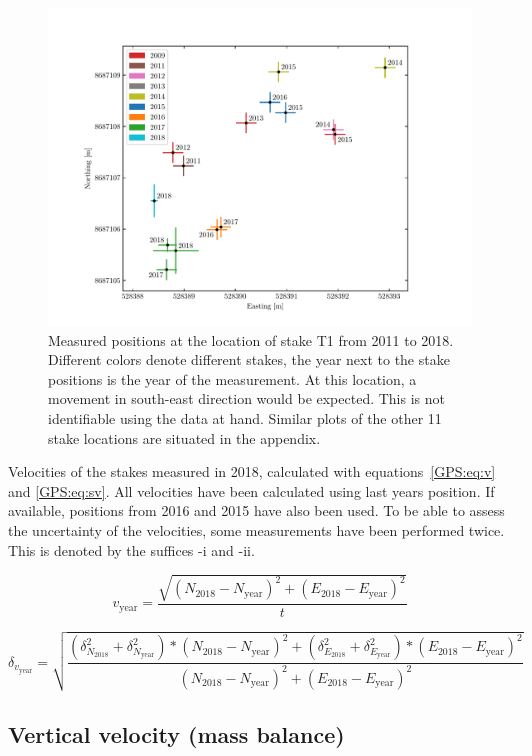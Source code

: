 \begin{figure}[H]
    \centering
    \includegraphics[width=\textwidth]{./figs/T1_2d.pdf}
    \caption{Measured positions at the location of stake T1 from 2011 to 2018.
    Different colors denote different stakes,
  	the year next to the stake positions is the year of the measurement.
    	At this location, a movement in south-east direction would be expected.
    	This is not identifiable using the data at hand.
 	Similar plots of the other 11 stake locations are situated in the appendix.}
    \label{GPS:fig:T1_2d}
\end{figure}


\begin{table}[h]
	\caption{Velocities of the stakes measured in 2018, calculated with equations~\ref{GPS:eq:v} and \ref{GPS:eq:sv}.
	All velocities have been calculated using last years position.
	If available, positions from 2016 and 2015 have also been used.
	To be able to assess the uncertainty of the velocities, some measurements have been performed twice.
	This is denoted by the suffices -i and -ii.}
	\centering
	
	\label{GPS:tab:os_tab}
\end{table}

\begin{equation}
\label{GPS:eq:v}
v_\text{year} = \frac{\sqrt{(N_{2018}-N_{\text{year}})^2+(E_{2018} - E_{\text{year}})^2}}{t}
\end{equation}

\begin{equation}
\label{GPS:eq:sv}
\delta_{v_{\text{year}}} = \sqrt{\frac{
(\delta_{N_{2018}}^2 + \delta_{N_{\text{year}}}^2) * (N_{2018}-N_{\text{year}})^2 +
(\delta_{E_{2018}}^2 + \delta_{E_{\text{year}}}^2) * (E_{2018}-E_{\text{year}})^2}
{(N_{2018} - N_{\text{year}})^2+ (E_{2018} - E_{\text{year}})^2}}
\end{equation}




\subsection{Vertical velocity (mass balance)}